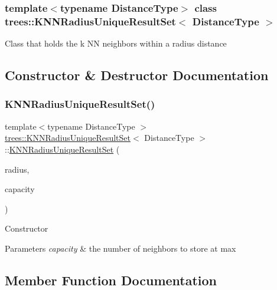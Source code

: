 \subsubsection*{template$<$typename Distance\+Type$>$\newline
class trees\+::\+K\+N\+N\+Radius\+Unique\+Result\+Set$<$ Distance\+Type $>$}

Class that holds the k NN neighbors within a radius distance 

\subsection{Constructor \& Destructor Documentation}
\mbox{\label{classtrees_1_1_k_n_n_radius_unique_result_set_ab20dd750c139d441ab3d715a4b4f1bac}} 
\subsubsection{\texorpdfstring{K\+N\+N\+Radius\+Unique\+Result\+Set()}{KNNRadiusUniqueResultSet()}}
{\footnotesize\ttfamily template$<$typename Distance\+Type $>$ \\
\hyperlink{classtrees_1_1_k_n_n_radius_unique_result_set}{trees\+::\+K\+N\+N\+Radius\+Unique\+Result\+Set}$<$ Distance\+Type $>$\+::\hyperlink{classtrees_1_1_k_n_n_radius_unique_result_set}{K\+N\+N\+Radius\+Unique\+Result\+Set} (\begin{DoxyParamCaption}\item[{Distance\+Type}]{radius,  }\item[{size\+\_\+t}]{capacity }\end{DoxyParamCaption})\hspace{0.3cm}{\ttfamily [inline]}}

Constructor 
\begin{DoxyParams}{Parameters}
{\em capacity} & the number of neighbors to store at max \\
\hline
\end{DoxyParams}


\subsection{Member Function Documentation}
\mbox{\label{classtrees_1_1_k_n_n_radius_unique_result_set_abf3186df7ed3776c34d824b768975ff9}} 
